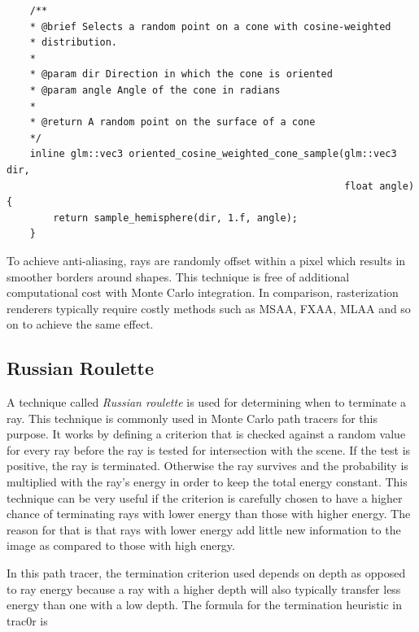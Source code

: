 \documentclass[
  twoside,
  11pt, a4paper,
  footinclude=true,
  headinclude=true,
  cleardoublepage=empty
]{scrreprt}
\begin{document}
\clearpage
\begin{verbatim}
    /**
    * @brief Selects a random point on a cone with cosine-weighted
    * distribution.
    *
    * @param dir Direction in which the cone is oriented
    * @param angle Angle of the cone in radians
    *
    * @return A random point on the surface of a cone
    */
    inline glm::vec3 oriented_cosine_weighted_cone_sample(glm::vec3 dir,
                                                          float angle) {
        return sample_hemisphere(dir, 1.f, angle);
    }
\end{verbatim}
\begingroup
{}
\endgroup

To achieve anti-aliasing, rays are randomly offset within a pixel which results in smoother borders
around shapes. This technique is free of additional computational cost with Monte Carlo integration.
In comparison, rasterization renderers typically require costly methods such as MSAA, FXAA, MLAA
and so on \cite{site:eurogamer-antialiasing} to achieve the same effect.

\subsection{Russian Roulette}
A technique called \emph{Russian roulette} \cite{caflisch1998monte} is used for determining when to terminate a ray. This
technique is commonly used in Monte Carlo path tracers for this purpose. It works by defining a
criterion that is checked against a random value for every ray before the ray is tested for
intersection with the scene. If the test is positive, the ray is terminated. Otherwise the ray
survives and the probability is multiplied with the ray's energy in order to keep the total energy
constant. This technique can be very useful if the criterion is carefully chosen to have a higher
chance of terminating rays with lower energy than those with higher energy. The reason for that is
that rays with lower energy add little new information to the image as compared to those with high
energy. 

In this path tracer, the termination criterion used depends on depth as opposed to ray energy
because a ray with a higher depth will also typically transfer less energy than one with a low
depth. The formula for the termination heuristic in trac0r is
\end{document}
